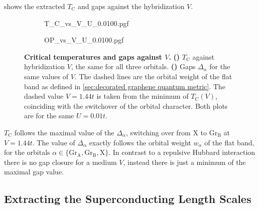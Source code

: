 \documentclass[../notes.tex]{subfiles}
\begin{document}
 shows the extracted \(T_{\mathrm{C}}\) and gaps against the hybridization \(V\).
\begin{figure}[tb]
	\centering
	\begin{subfigure}[b]{0.5\textwidth}
		\centering
		\caption{\hfill\null}\label{sfig:decorated graphene critical temperatures vs V}
		{T_C_vs_V_U_0.0100.pgf}
	\end{subfigure}%
	\begin{subfigure}[b]{0.5\textwidth}
		\centering
		\caption{\hfill\null}\label{sfig:decorated graphene gaps vs V}
		{OP_vs_V_U_0.0100.pgf}
	\end{subfigure}
	\caption[Critical temperatures and gaps against \(V\).]{
		\textbf{Critical temperatures and gaps against \(V\).}
		\textbf{()} \(T_{\mathrm{C}}\) against hybridization \(V\), the same for all three orbitals. \textbf{()} Gaps \(\Delta_{\alpha}\) for the same values of \(V\). The dashed lines are the orbital weight of the flat band as defined in \cref{sec:decorated graphene quantum metric}. The dashed value \(V = 1.44t\) is taken from the minimum of \(T_{\mathrm{C}} (V)\), coinciding with the switchover of the orbital character. Both plots are for the same \(U = 0.01t\).
	} 
	\label{fig:decorated graphene TC and gaps against V}
\end{figure}
\(T_{\mathrm{C}}\) follows the maximal value of the \(\Delta_{\alpha}\), switching over from \(\mathrm{X}\) to \(\mathrm{Gr}_{\mathrm{B}}\) at \(V = 1.44t\).
The value of \(\Delta_{\alpha}\) exactly follows the orbital weight \(w_{\alpha}\) of the flat band, for the orbitals \(\alpha \in \{\mathrm{Gr}_{\mathrm{A}}, \mathrm{Gr}_{\mathrm{B}}, \mathrm{X}\}\).
In contrast to a repulsive Hubbard interaction \cite{wittQuantumGeometryLocal2025} there is no gap closure for a medium \(V\), instead there is just a minimum of the maximal gap value.

\subsection*{Extracting the Superconducting Length Scales}
\end{document}
